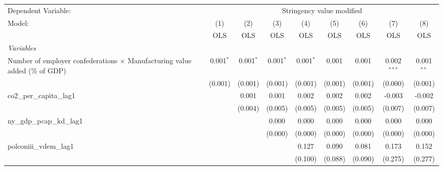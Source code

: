 
\begingroup
\centering
\begin{tabular}{lcccccccc}
   \toprule
   Dependent Variable: & \multicolumn{8}{c}{Stringency value modified}\\
   Model:                                                                             & (1)         & (2)         & (3)         & (4)         & (5)     & (6)     & (7)           & (8)\\  
                                                                                      &  OLS        & OLS         & OLS         & OLS         & OLS     & OLS     & OLS           & OLS\\  
   \midrule
   \emph{Variables}\\
   Number of employer confederations $\times$ Manufacturing value added (\% of GDP)   & 0.001$^{*}$ & 0.001$^{*}$ & 0.001$^{*}$ & 0.001$^{*}$ & 0.001   & 0.001   & 0.002$^{***}$ & 0.001$^{**}$\\   
                                                                                      & (0.001)     & (0.001)     & (0.001)     & (0.001)     & (0.001) & (0.001) & (0.000)       & (0.001)\\   
   co2\_per\_capita\_lag1                                                             &             & 0.001       & 0.001       & 0.002       & 0.002   & 0.002   & -0.003        & -0.002\\   
                                                                                      &             & (0.004)     & (0.005)     & (0.005)     & (0.005) & (0.005) & (0.007)       & (0.007)\\   
   ny\_gdp\_pcap\_kd\_lag1                                                            &             &             & 0.000       & 0.000       & 0.000   & 0.000   & 0.000         & 0.000\\   
                                                                                      &             &             & (0.000)     & (0.000)     & (0.000) & (0.000) & (0.000)       & (0.000)\\   
   polconiii\_vdem\_lag1                                                              &             &             &             & 0.127       & 0.090   & 0.081   & 0.173         & 0.152\\   
                                                                                      &             &             &             & (0.100)     & (0.088) & (0.090) & (0.275)       & (0.277)\\   

\end{tabular}
